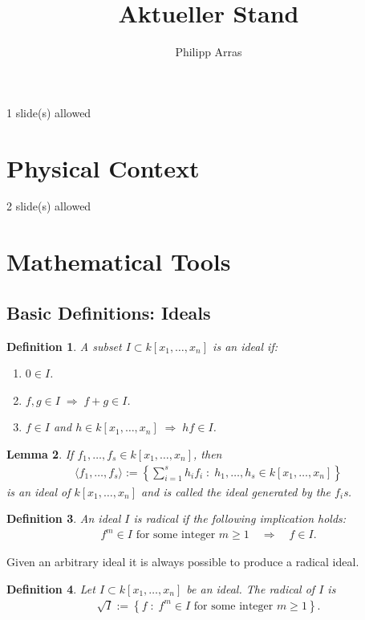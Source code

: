 \documentclass[11pt,a4paper,english]{scrartcl}
\author{Philipp Arras}
\title{Aktueller Stand}
\newtheorem{defn}{Definition}
\newtheorem{lem}[defn]{Lemma}
\newcommand{\mvar}[2]{#1_1,\ldots , #1_{#2}}
\newcommand{\kxn}{k[\mvar{x}{n}]}
\newcommand{\needSlides}[1]{\newpage \begin{needSl}#1 slide(s) allowed\end{needSl}}
\begin{document}
\VerbatimFootnotes
\tableofcontents

\needSlides{1}
\section{Physical Context}

\needSlides{2}
\section{Mathematical Tools}
\subsection{Basic Definitions: Ideals}
\begin{defn}
A subset $I\subset k[\mvar{x}{n}]$ is an \emph{ideal} if:
\begin{enumerate}
\item $0 \in I$.
\item $f,g\in I \;\Rightarrow \; f+g\in I$.
\item $f\in I$ and $h\in k[\mvar{x}{n}] \;\Rightarrow\; hf\in I$.
\end{enumerate}
\end{defn}

\begin{lem}
If $\mvar{f}{s}\in k[\mvar{x}{n}]$, then 
\begin{align*}
\langle \mvar{f}{s} \rangle := \left\lbrace \sum_{i=1}^s h_i f_i \; : \;  \mvar{h}{s} \in \kxn \right\rbrace
\end{align*}
 is an ideal of $\kxn$ and is called the \emph{ideal generated by the $f_i$s}.
\end{lem}

\begin{defn}
An ideal $I$ is \emph{radical} if the following implication holds:
\begin{align*}
f^m \in I \text{ for some integer } m\geq 1 \quad \Rightarrow\quad f\in I.
\end{align*}
\end{defn}

Given an arbitrary ideal it is always possible to produce a radical ideal.
\begin{defn}
Let $I \subset \kxn$ be an ideal. The \emph{radical} of $I$  is 
\begin{align*}
\sqrt{I} := \left\lbrace  f\; :\; f^m \in I \text{ for some integer } m\geq 1  \right\rbrace .
\end{align*}
\end{defn} 
\end{document}
